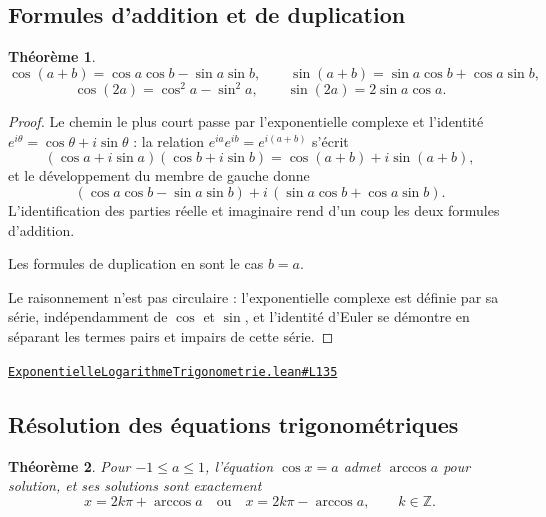 \documentclass[11pt,a4paper]{article}
\theoremstyle{definition}
\theoremstyle{plain}
\newtheorem{theoreme}{Théorème}
\newcommand{\source}[2]{\par\smallskip\noindent\hfill{\footnotesize\href{#1}{\texttt{#2}}}\par\smallskip}
\begin{document}
\subsection{Formules d'addition et de duplication}

\begin{theoreme}
\[ \cos(a + b) = \cos a \cos b - \sin a \sin b, \qquad
   \sin(a + b) = \sin a \cos b + \cos a \sin b, \]
\[ \cos(2a) = \cos^{2} a - \sin^{2} a, \qquad \sin(2a) = 2 \sin a \cos a . \]
\end{theoreme}

\begin{proof}
Le chemin le plus court passe par l'exponentielle complexe et l'identité $e^{i\theta} = \cos\theta +
i\sin\theta$ : la relation $e^{ia}e^{ib} = e^{i(a+b)}$ s'écrit
\[ (\cos a + i\sin a)(\cos b + i\sin b)
   = \cos(a+b) + i\sin(a+b) , \]
et le développement du membre de gauche donne
\[ (\cos a\cos b - \sin a\sin b) + i\,(\sin a\cos b + \cos a\sin b) . \]
L'identification des parties réelle et imaginaire rend d'un coup les deux formules
d'addition.

Les formules de duplication en sont le cas $b = a$.

\medskip\noindent
Le raisonnement n'est pas circulaire : l'exponentielle complexe est définie par sa série,
indépendamment de $\cos$ et $\sin$, et l'identité d'Euler se démontre en séparant les termes
pairs et impairs de cette série.
\end{proof}
\source{https://github.com/Commutator-IO/learn-lean/blob/main/courses/02-lycee/05-exponentielle-logarithme-trigonometrie/ExponentielleLogarithmeTrigonometrie.lean\#L135}{ExponentielleLogarithmeTrigonometrie.lean\#L135}

\subsection{Résolution des équations trigonométriques}

\begin{theoreme}
Pour $-1 \le a \le 1$, l'équation $\cos x = a$ admet $\arccos a$ pour solution, et ses
solutions sont exactement
\[ x = 2k\pi + \arccos a \quad \text{ou} \quad x = 2k\pi - \arccos a,
   \qquad k \in \mathbb{Z} . \]
\end{theoreme}
\end{document}
